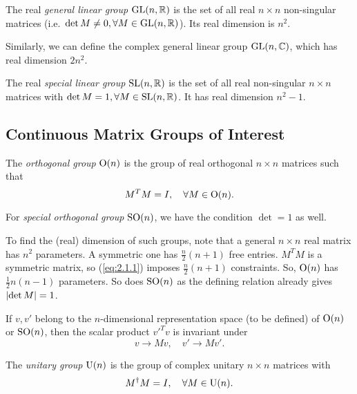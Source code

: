 \documentclass[a4paper,11pt]{article}
\begin{document}
	\begin{defi}
		The real \emph{general linear group} $\operatorname{GL}(n,\mathbb{R})$ is the set of all real $n \times n$ non-singular matrices (i.e.\ $\det M \neq 0, \forall M \in \operatorname{GL}(n,\mathbb{R})$). Its real dimension is $n^2$.

		Similarly, we can define the complex general linear group $\operatorname{GL} (n,\mathbb{C})$, which has real dimension $2 n^2$.
	\end{defi}

	\begin{defi}
		The real \emph{special linear group} $\operatorname{SL}(n,\mathbb{R})$ is the set of all real non-singular $n \times n$ matrices with $\det M = 1, \forall M \in \operatorname{SL}(n,\mathbb{R})$. It has real dimension $n^2 - 1$.
	\end{defi}

	\subsection{Continuous Matrix Groups of Interest}

	
	\begin{defi}
		The \emph{orthogonal group} $\operatorname{O}(n)$ is the group of real orthogonal $n\times n$ matrices such that \begin{equation}
			M^T M = I, \quad \forall M \in \operatorname{O}(n).
			\label{eq:2.1.1}
		\end{equation}
		
		For \emph{special orthogonal group} $\operatorname{SO}(n)$, we have the condition $\det = 1$ as well.
	\end{defi}

	To find the (real) dimension of such groups, note that a general $n \times n$ real matrix has $n^2$ parameters. A symmetric one has $\frac{n}{2} (n+1)$ free entries. $M^T M$ is a symmetric matrix, so (\ref{eq:2.1.1}) imposes $\frac{n}{2}(n+1)$ constraints. So, $\operatorname{O}(n)$ has $\frac{1}{2} n (n-1)$ parameters. So does $\operatorname{SO}(n)$ as the defining relation already gives $\abs{\det M}=1$.
	
	If $v,v'$ belong to the $n$-dimensional representation space (to be defined) of $\operatorname{O}(n)$ or $\operatorname{SO}(n)$, then the scalar product $v'^T v$ is invariant under
	\[
		v \to Mv, \quad v' \to Mv'.
	\]

	\begin{defi}
		The \emph{unitary group} $\operatorname{U}(n)$ is the group of complex unitary $n\times n$ matrices with 
		\begin{equation}
			M^\dagger M = I, \quad \forall M \in \operatorname{U}(n).
			\label{eq:2.1.2}
		\end{equation} 
	\end{defi}
\end{document}

